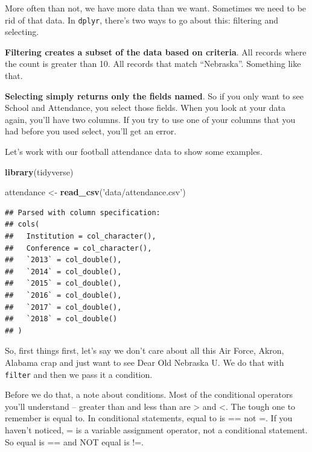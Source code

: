 \documentclass[]{book}
\newenvironment{Shaded}{\begin{snugshade}}{\end{snugshade}}
\newcommand{\KeywordTok}[1]{\textcolor[rgb]{0.13,0.29,0.53}{\textbf{#1}}}
\newcommand{\StringTok}[1]{\textcolor[rgb]{0.31,0.60,0.02}{#1}}
\newcommand{\NormalTok}[1]{#1}
\begin{document}
More often than not, we have more data than we want. Sometimes we need
to be rid of that data. In \texttt{dplyr}, there's two ways to go about
this: filtering and selecting.

\textbf{Filtering creates a subset of the data based on criteria}. All
records where the count is greater than 10. All records that match
``Nebraska''. Something like that.

\textbf{Selecting simply returns only the fields named}. So if you only
want to see School and Attendance, you select those fields. When you
look at your data again, you'll have two columns. If you try to use one
of your columns that you had before you used select, you'll get an
error.

Let's work with our football attendance data to show some examples.

\begin{Shaded}
\begin{Highlighting}[]
\KeywordTok{library}\NormalTok{(tidyverse)}
\end{Highlighting}
\end{Shaded}

\begin{Shaded}
\begin{Highlighting}[]
\NormalTok{attendance <-}\StringTok{ }\KeywordTok{read_csv}\NormalTok{(}\StringTok{'data/attendance.csv'}\NormalTok{)}
\end{Highlighting}
\end{Shaded}

\begin{verbatim}
## Parsed with column specification:
## cols(
##   Institution = col_character(),
##   Conference = col_character(),
##   `2013` = col_double(),
##   `2014` = col_double(),
##   `2015` = col_double(),
##   `2016` = col_double(),
##   `2017` = col_double(),
##   `2018` = col_double()
## )
\end{verbatim}

So, first things first, let's say we don't care about all this Air
Force, Akron, Alabama crap and just want to see Dear Old Nebraska U. We
do that with \texttt{filter} and then we pass it a condition.

Before we do that, a note about conditions. Most of the conditional
operators you'll understand -- greater than and less than are
\textgreater{} and \textless{}. The tough one to remember is equal to.
In conditional statements, equal to is == not =. If you haven't noticed,
= is a variable assignment operator, not a conditional statement. So
equal is == and NOT equal is !=.
\end{document}
